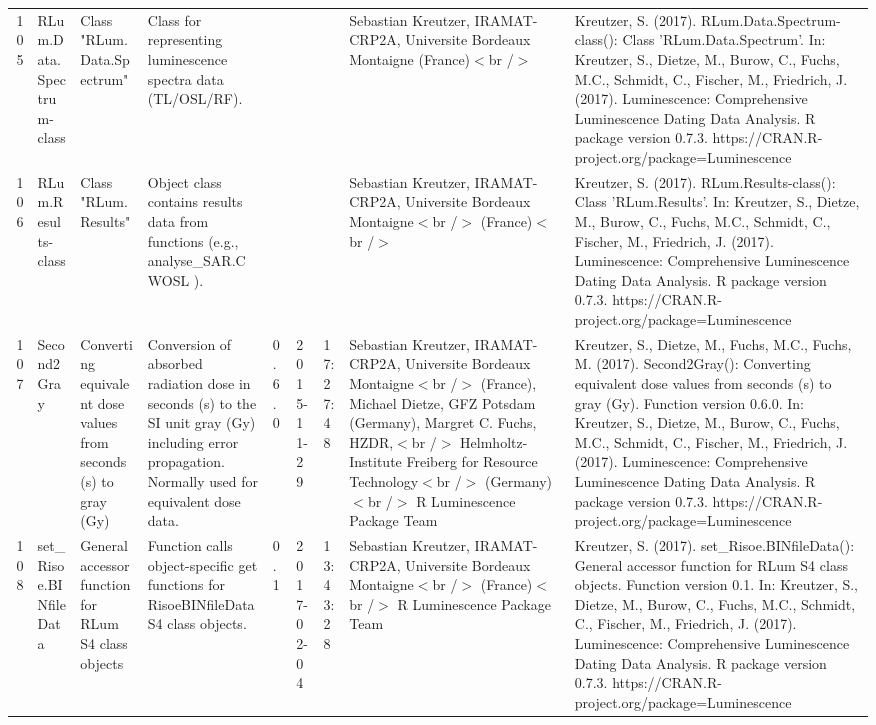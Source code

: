 \begin{table}[ht]
\begin{tabular}{rllllllll}
 \\ 
  105 & RLum.Data.Spectrum-class & Class  "RLum.Data.Spectrum" & Class for representing luminescence spectra data (TL/OSL/RF). &  &  &  & Sebastian Kreutzer, IRAMAT-CRP2A, Universite Bordeaux Montaigne (France)$<$br /$>$ & Kreutzer, S. (2017). RLum.Data.Spectrum-class(): Class 'RLum.Data.Spectrum'. In: Kreutzer, S., Dietze, M., Burow, C., Fuchs, M.C., Schmidt, C., Fischer, M., Friedrich, J. (2017). Luminescence: Comprehensive Luminescence Dating Data Analysis. R package version 0.7.3. https://CRAN.R-project.org/package=Luminescence
 \\ 
  106 & RLum.Results-class & Class  "RLum.Results" & Object class contains results data from functions (e.g.,  analyse\_SAR.CWOSL ). &  &  &  & Sebastian Kreutzer, IRAMAT-CRP2A, Universite Bordeaux Montaigne$<$br /$>$ (France)$<$br /$>$ & Kreutzer, S. (2017). RLum.Results-class(): Class 'RLum.Results'. In: Kreutzer, S., Dietze, M., Burow, C., Fuchs, M.C., Schmidt, C., Fischer, M., Friedrich, J. (2017). Luminescence: Comprehensive Luminescence Dating Data Analysis. R package version 0.7.3. https://CRAN.R-project.org/package=Luminescence
 \\ 
  107 & Second2Gray & Converting equivalent dose values from seconds (s) to gray (Gy) & Conversion of absorbed radiation dose in seconds (s) to the SI unit gray (Gy) including error propagation. Normally used for equivalent dose data. & 0.6.0 & 2015-11-29 & 17:27:48
 & Sebastian Kreutzer, IRAMAT-CRP2A, Universite Bordeaux Montaigne$<$br /$>$ (France),  Michael Dietze, GFZ Potsdam (Germany),  Margret C. Fuchs, HZDR,$<$br /$>$ Helmholtz-Institute Freiberg for Resource Technology$<$br /$>$ (Germany)$<$br /$>$  R Luminescence Package Team & Kreutzer, S., Dietze, M., Fuchs, M.C., Fuchs, M. (2017). Second2Gray(): Converting equivalent dose values from seconds (s) to gray (Gy). Function version 0.6.0. In: Kreutzer, S., Dietze, M., Burow, C., Fuchs, M.C., Schmidt, C., Fischer, M., Friedrich, J. (2017). Luminescence: Comprehensive Luminescence Dating Data Analysis. R package version 0.7.3. https://CRAN.R-project.org/package=Luminescence
 \\ 
  108 & set\_Risoe.BINfileData & General accessor function for RLum S4 class objects & Function calls object-specific get functions for RisoeBINfileData S4 class objects. & 0.1 & 2017-02-04 & 13:43:28
 & Sebastian Kreutzer, IRAMAT-CRP2A, Universite Bordeaux Montaigne$<$br /$>$ (France)$<$br /$>$  R Luminescence Package Team & Kreutzer, S. (2017). set\_Risoe.BINfileData(): General accessor function for RLum S4 class objects. Function version 0.1. In: Kreutzer, S., Dietze, M., Burow, C., Fuchs, M.C., Schmidt, C., Fischer, M., Friedrich, J. (2017). Luminescence: Comprehensive Luminescence Dating Data Analysis. R package version 0.7.3. https://CRAN.R-project.org/package=Luminescence

\end{tabular}
\end{table}
